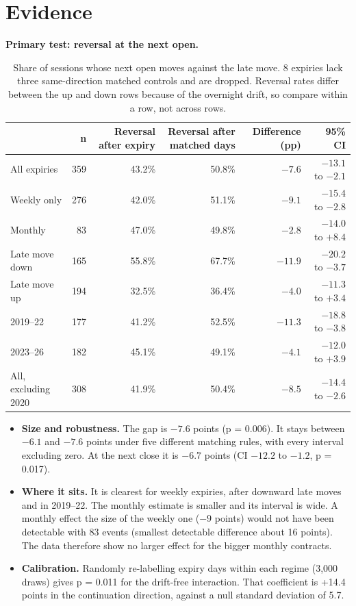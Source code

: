 \documentclass[10pt,a4paper]{article}
\begin{document}
\section*{Evidence}
\textbf{Primary test: reversal at the next open.}
\begin{table}[h!]\centering\small
\begin{tabular}{lrrrrr}
\toprule
 & n & Reversal after expiry & Reversal after matched days & Difference (pp) & 95\% CI\\
\midrule
All expiries & 359 & 43.2\% & 50.8\% & $-7.6$ & $-13.1$ to $-2.1$\\
Weekly only & 276 & 42.0\% & 51.1\% & $-9.1$ & $-15.4$ to $-2.8$\\
Monthly & 83 & 47.0\% & 49.8\% & $-2.8$ & $-14.0$ to $+8.4$\\
Late move down & 165 & 55.8\% & 67.7\% & $-11.9$ & $-20.2$ to $-3.7$\\
Late move up & 194 & 32.5\% & 36.4\% & $-4.0$ & $-11.3$ to $+3.4$\\
2019--22 & 177 & 41.2\% & 52.5\% & $-11.3$ & $-18.8$ to $-3.8$\\
2023--26 & 182 & 45.1\% & 49.1\% & $-4.1$ & $-12.0$ to $+3.9$\\
All, excluding 2020 & 308 & 41.9\% & 50.4\% & $-8.5$ & $-14.4$ to $-2.6$\\
\bottomrule
\end{tabular}
\caption{Share of sessions whose next open moves against the late move. 8 expiries lack three same-direction matched controls and are dropped. Reversal rates differ between the up and down rows because of the overnight drift, so compare within a row, not across rows.}
\end{table}

\begin{itemize}
\item \textbf{Size and robustness.} The gap is $-7.6$ points (p = 0.006). It stays between $-6.1$ and $-7.6$ points under five different matching rules, with every interval excluding zero. At the next close it is $-6.7$ points (CI $-12.2$ to $-1.2$, p = 0.017).
\item \textbf{Where it sits.} It is clearest for weekly expiries, after downward late moves and in 2019--22. The monthly estimate is smaller and its interval is wide. A monthly effect the size of the weekly one ($-9$ points) would not have been detectable with 83 events (smallest detectable difference about 16 points). The data therefore show no larger effect for the bigger monthly contracts.
\item \textbf{Calibration.} Randomly re-labelling expiry days within each regime (3{,}000 draws) gives p = 0.011 for the drift-free interaction. That coefficient is +14.4 points in the continuation direction, against a null standard deviation of 5.7.
\end{itemize}
\end{document}
